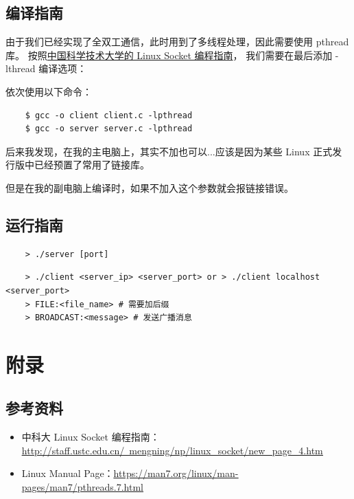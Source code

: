 \documentclass[14pt,a4paper,UTF8,twoside]{article}
\begin{document}
\subsection{编译指南}

由于我们已经实现了全双工通信，此时用到了多线程处理，因此需要使用 pthread 库。
按照\href{http://staff.ustc.edu.cn/~mengning/np/linux_socket/new_page_4.htm}{中国科学技术大学的 Linux Socket 编程指南}，
我们需要在最后添加 -lthread 编译选项：

依次使用以下命令：

\begin{lstlisting}
    $ gcc -o client client.c -lpthread
    $ gcc -o server server.c -lpthread
\end{lstlisting}

\begin{ctt}
    后来我发现，在我的主电脑上，其实不加也可以...应该是因为某些 Linux 正式发行版中已经预置了常用了链接库。
    
    但是在我的副电脑上编译时，如果不加入这个参数就会报链接错误。
\end{ctt}

\subsection{运行指南}

\begin{lstlisting}
    > ./server [port]
\end{lstlisting}

\begin{lstlisting}
    > ./client <server_ip> <server_port> or > ./client localhost <server_port>
    > FILE:<file_name> # 需要加后缀
    > BROADCAST:<message> # 发送广播消息
\end{lstlisting}

\section{附录}

\subsection{参考资料}

\begin{itemize}
    \item 中科大 Linux Socket 编程指南：\href{http://staff.ustc.edu.cn/~mengning/np/linux_socket/new_page_4.htm}{\underline{http://staff.ustc.edu.cn/~mengning/np/linux\_socket/new\_page\_4.htm}}
    \item Linux Manual Page：\href{https://man7.org/linux/man-pages/man7/pthreads.7.html}{\underline{https://man7.org/linux/man-pages/man7/pthreads.7.html}}
\end{itemize}
\end{document}
